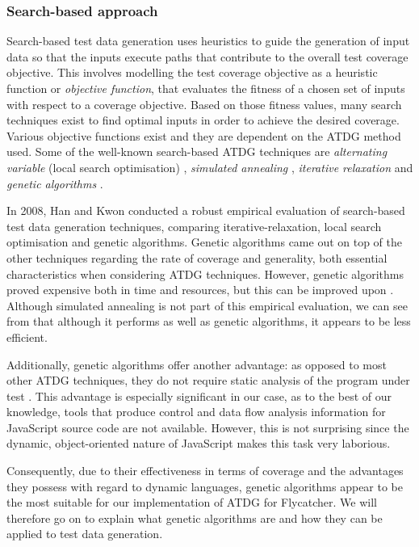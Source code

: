 \subsubsection{Search-based approach}

Search-based test data generation uses heuristics to guide the generation of input data so that the inputs execute paths that contribute to the overall test coverage objective. This involves modelling the test coverage objective as a heuristic function or \emph{objective function}, that evaluates the fitness of a chosen set of inputs with respect to a coverage objective. Based on those fitness values, many search techniques exist to find optimal inputs in order to achieve the desired coverage. Various objective functions exist and they are dependent on the ATDG method used. Some of the well-known search-based ATDG techniques are \emph{alternating variable} (local search optimisation) \cite{korel1990automated, gallagher1997adtest}, \emph{simulated annealing} \cite{tracey1998automated,tracey1998way}, \emph{iterative relaxation} \cite{gupta1998automated} and \emph{genetic algorithms} \cite{michael1998automated,michael2001generating}.
 
In 2008, Han and Kwon \cite{han2008empirical} conducted a robust empirical evaluation of search-based test data generation techniques, comparing iterative-relaxation, local search optimisation and genetic algorithms. Genetic algorithms came out on top of the other techniques regarding the rate of coverage and generality, both essential characteristics when considering ATDG techniques. However, genetic algorithms proved expensive both in time and resources, but this can be improved upon \cite{han2008empirical}.
Although simulated annealing is not part of this empirical evaluation, we can see from \cite{michael1998automated} that although it performs as well as genetic algorithms, it appears to be less efficient.

Additionally, genetic algorithms offer another advantage: as opposed to most other ATDG techniques, they do not require static analysis of the program under test \cite{han2008empirical}. This advantage is especially significant in our case, as to the best of our knowledge, tools that produce control and data flow analysis information for JavaScript source code are not available. However, this is not surprising since the dynamic, object-oriented nature of JavaScript makes this task very laborious.

Consequently, due to their effectiveness in terms of coverage and the advantages they possess with regard to dynamic languages, genetic algorithms appear to be the most suitable for our implementation of ATDG for \textsf{Flycatcher}. We will therefore go on to explain what genetic algorithms are and how they can be applied to test data generation.


